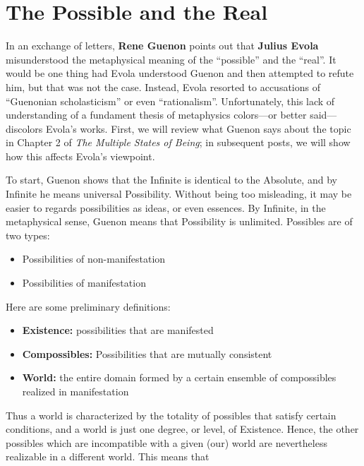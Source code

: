 \section{The Possible and the Real}

In an exchange of letters, \textbf{Rene Guenon} points out that \textbf{Julius Evola} misunderstood the metaphysical meaning of the “possible” and the “real”. It would be one thing had Evola understood Guenon and then attempted to refute him, but that was not the case. Instead, Evola resorted to accusations of “Guenonian scholasticism” or even “rationalism”. Unfortunately, this lack of understanding of a fundament thesis of metaphysics colors—or better said—discolors Evola's works. First, we will review what Guenon says about the topic in Chapter 2 of \textit{The Multiple States of Being}; in subsequent posts, we will show how this affects Evola's viewpoint.

To start, Guenon shows that the Infinite is identical to the Absolute, and by Infinite he means universal Possibility. Without being too misleading, it may be easier to regards possibilities as ideas, or even essences. By Infinite, in the metaphysical sense, Guenon means that Possibility is unlimited. Possibles are of two types:

\begin{itemize}[nosep]
\item Possibilities of non-manifestation 
\item Possibilities of manifestation 
\end{itemize}
Here are some preliminary definitions:

\begin{itemize}[nosep]
\item\textbf{Existence:} possibilities that are manifested 

\item\textbf{Compossibles:} Possibilities that are mutually consistent 

\item\textbf{World:} the entire domain formed by a certain ensemble of compossibles realized in manifestation 

\end{itemize}
Thus a world is characterized by the totality of possibles that satisfy certain conditions, and a world is just one degree, or level, of Existence. Hence, the other possibles which are incompatible with a given (our) world are nevertheless realizable in a different world. This means that

